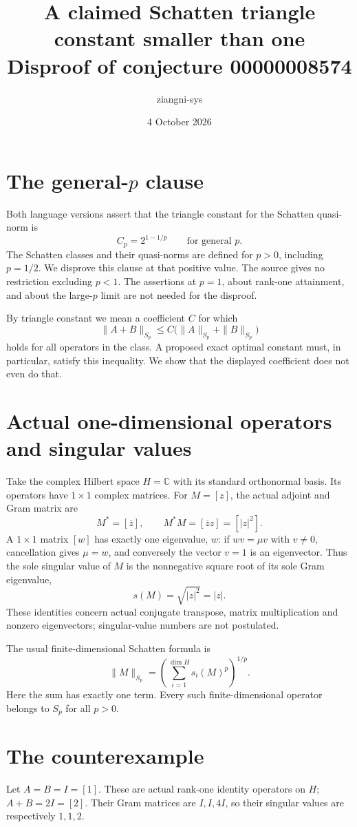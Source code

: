 \documentclass[11pt,a4paper]{article}
\title{A claimed Schatten triangle constant smaller than one\\Disproof of conjecture 00000008574}
\author{ziangni-sys}
\date{4 October 2026}
\begin{document}
\maketitle
\section*{The general-$p$ clause}
Both language versions assert that the triangle constant for the Schatten quasi-norm is
\[
 C_p=2^{1-1/p}\qquad\text{for general }p.
\]
The Schatten classes and their quasi-norms are defined for $p>0$, including $p=1/2$. We disprove this clause at that positive value. The source gives no restriction excluding $p<1$. The assertions at $p=1$, about rank-one attainment, and about the large-$p$ limit are not needed for the disproof.

By triangle constant we mean a coefficient $C$ for which
\[
 \|A+B\|_{S_p}\leq C\bigl(\|A\|_{S_p}+\|B\|_{S_p}\bigr)
\]
holds for all operators in the class. A proposed exact optimal constant must, in particular, satisfy this inequality. We show that the displayed coefficient does not even do that.

\section*{Actual one-dimensional operators and singular values}
Take the complex Hilbert space $H=\mathbb C$ with its standard orthonormal basis. Its operators have $1\times1$ complex matrices. For $M=[z]$, the actual adjoint and Gram matrix are
\[
 M^*=[\overline z],\qquad M^*M=[\overline z z]=[|z|^2].
\]
A $1\times1$ matrix $[w]$ has exactly one eigenvalue, $w$: if $wv=\mu v$ with $v\ne0$, cancellation gives $\mu=w$, and conversely the vector $v=1$ is an eigenvector. Thus the sole singular value of $M$ is the nonnegative square root of its sole Gram eigenvalue,
\[
 s(M)=\sqrt{|z|^2}=|z|.
\]
These identities concern actual conjugate transpose, matrix multiplication and nonzero eigenvectors; singular-value numbers are not postulated.

The usual finite-dimensional Schatten formula is
\[
 \|M\|_{S_p}=\left(\sum_{i=1}^{\dim H}s_i(M)^p\right)^{1/p}.
\]
Here the sum has exactly one term. Every such finite-dimensional operator belongs to $S_p$ for all $p>0$.

\newpage
\section*{The counterexample}
Let $A=B=I=[1]$. These are actual rank-one identity operators on $H$; $A+B=2I=[2]$. Their Gram matrices are $I,I,4I$, so their singular values are respectively $1,1,2$.
\end{document}
